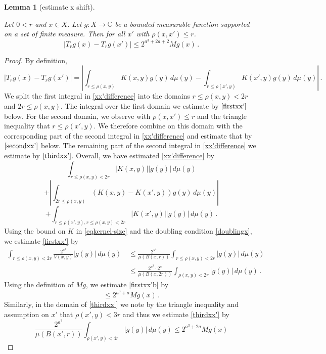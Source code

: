 \documentclass[10pt,a4paper]{article}
\theoremstyle{plain}
\newtheorem{lemma}[theorem]{Lemma}
\theoremstyle{definition}
\numberwithin{equation}{subsection}
\newcommand{\lean}[1]{}
\newcommand{\proves}[1]{}
\newcommand{\uses}[1]{}
\newcommand{\leanok}{}
\def\C{\mathbb{C}}
\begin{document}
\begin{lemma}[estimate x shift]
\label{estimate-x-shift}
\leanok
\lean{estimate_x_shift}
\uses{geometric-series-estimate}
Let $0<r$ and  $x\in X$. Let $g:X\to\C$ be a bounded measurable function supported on a set of finite measure.
Then for all $x'$ with $\rho(x,x')\le r$.
\begin{equation*}
\left| T_r g(x) - T_r g(x') \right|
\le 2^{a^3 + 2a + 2} Mg(x)\, .
\end{equation*}
\end{lemma}
\begin{proof}
\proves{estimate-x-shift}
\leanok
By definition,
\begin{equation}
\label{xx'difference}
\left| T_r g(x) - T_r g(x') \right|
=\left|\int_{r\le\rho(x,y)} K(x,y) g(y) \,d\mu(y)
-\int_{r\le\rho(x',y)}
K(x',y) g(y)\, d\mu(y)
\right| \, .
\end{equation}
We split the first integral in \eqref{xx'difference}
into the domains $r\le\rho(x,y)<2r$
and $2r\le\rho(x,y)$. The integral over the first domain we estimate
by $\eqref{firstxx'}$ below.
For the second domain, we
observe with $\rho(x,x')\le r$ and the triangle inequality that $r\le\rho(x',y)$. We therefore combine on this domain with the
corresponding part of the second integral in \eqref{xx'difference} and estimate that by $\eqref{secondxx'}$
below. The remaining part of the second integral in
\eqref{xx'difference} we estimate by $\eqref{thirdxx'}$.
Overall, we have estimated \eqref{xx'difference} by
\begin{equation}
\label{firstxx'}
\int_{r\le\rho(x,y)< 2r} |K(x,y)| |g(y)| \,d\mu(y)
\end{equation}
\begin{equation}
\label{secondxx'}
  +  \left|\int_{2r\le\rho(x,y)} (K(x,y)-K(x',y)) g(y) \,d\mu(y)
\right|
\end{equation}
\begin{equation}
\label{thirdxx'}
  +\int_{r\le\rho(x',y), r\le\rho(x,y)<2r}
|K(x',y)| |g(y)|\, d\mu(y)\,.
\end{equation}
Using the bound on $K$ in \eqref{eqkernel-size} and the doubling condition \eqref{doublingx}, we estimate \eqref{firstxx'} by
\begin{align}
 \int_{r\le\rho(x,y)<2r} \frac{2^{a^3}}{V(x,y)} |g(y)| \,d\mu(y)\,
&\le
\frac{2^{a^3}}{\mu(B(x,r))} \int_{r\le\rho(x,y)<2r}
|g(y)| \, d\mu(y)\, \\
\label{firstxx'b}
&\le
\frac{2^{a^3} \cdot 2^a}{\mu(B(x,2r))} \int_{\rho(x,y)<2r}
|g(y)| \, d\mu(y)\,
.
\end{align}
Using the definition of $Mg$, we estimate
\eqref{firstxx'b} by
\begin{equation}
\label{firstxx'c}
 \le 2^{a^3 + a} {Mg(x)}\, .
\end{equation}
Similarly, in the domain of \eqref{thirdxx'}
we note by the triangle inequality
and assumption on $x'$ that $\rho(x',y)<3r$ and thus we estimate
\eqref{thirdxx'}
by
\begin{equation}
\label{thirdxx'b}
\frac{2^{a^3}}{\mu(B(x',r))} \int_{\rho(x',y)<4r}
|g(y)| \, d\mu(y)\le 2^{a^3 + 2a} Mg(x)
\end{equation}


\end{proof}
\end{document}
